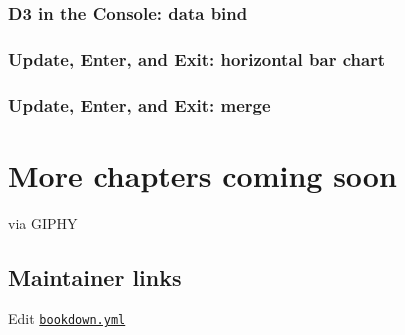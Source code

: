 \documentclass[openany]{book}
\begin{document}
\hypertarget{d3-in-the-console-data-bind}{%
\subsection*{D3 in the Console: data bind}\label{d3-in-the-console-data-bind}}

\hypertarget{update-enter-and-exit-horizontal-bar-chart}{%
\subsection*{Update, Enter, and Exit: horizontal bar chart}\label{update-enter-and-exit-horizontal-bar-chart}}

\hypertarget{update-enter-and-exit-merge}{%
\subsection*{Update, Enter, and Exit: merge}\label{update-enter-and-exit-merge}}

\hypertarget{more-chapters-coming-soon}{%
\chapter{More chapters coming soon }\label{more-chapters-coming-soon}}

via GIPHY

\hypertarget{maintainer-links}{%
\section{Maintainer links}\label{maintainer-links}}

Edit \href{https://github.com/jtr13/d3book/edit/master/_bookdown.yml}{\texttt{bookdown.yml}}


\end{document}
